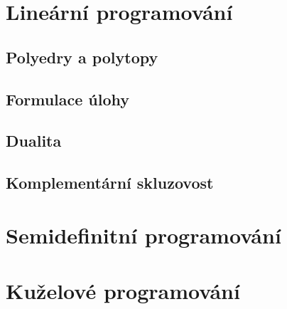 \chapter{Lineární programování}

\section{Polyedry a polytopy}

\section{Formulace úlohy}

\section{Dualita}

\section{Komplementární skluzovost}

\chapter{Semidefinitní programování}

\chapter{Kuželové programování}
